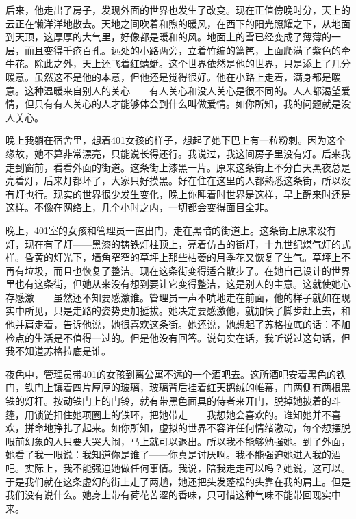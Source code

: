 后来，他走出了房子，发现外面的世界也发生了改变。现在正值傍晚时分，天上的云正在懒洋洋地散去。天地之间吹着和煦的暖风，在西下的阳光照耀之下，从地面到天顶，这厚厚的大气里，好像都是暖和的风。地面上的雪已经变成了薄薄的一层，而且变得千疮百孔。远处的小路两旁，立着竹编的篱笆，上面爬满了紫色的牵牛花。除此之外，天上还飞着红蜻蜓。这个世界依然是他的世界，只是添上了几分暖意。虽然这不是他的本意，但他还是觉得很好。他在小路上走着，满身都是暖意。这种温暖来自别人的关心——有人关心和没人关心是很不同的。人人都渴望爱情，但只有有人关心的人才能够体会到什么叫做爱情。如你所知，我的问题就是没人关心。 

晚上我躺在宿舍里，想着401女孩的样子，想起了她下巴上有一粒粉刺。因为这个缘故，她不算非常漂亮，只能说长得还行。我说过，我这间房子里没有灯。后来我走到窗前，看看外面的街道。这条街上漆黑一片。原来这条街上不分白天黑夜总是亮着灯，后来灯都坏了，大家只好摸黑。好在住在这里的人都熟悉这条街，所以没有灯也行。现实的世界很少发生变化，晚上你睡着时世界是这样，早上醒来时还是这样。不像在网络上，几个小时之内，一切都会变得面目全非。 



晚上，401室的女孩和管理员一直出门，走在黑暗的街道上。这条街上原来没有灯，现在有了灯——黑漆的铸铁灯柱顶上，亮着仿古的街灯，十九世纪煤气灯的式样。昏黄的灯光下，墙角窄窄的草坪上那些枯萎的月季花又恢复了生气。草坪上不再有垃圾，而且也恢复了整洁。现在这条街变得适合散步了。在她自己设计的世界里也有这条街，但她从来没有想到要让它变得整洁，这是别人的主意。这就使她心存感激——虽然还不知要感激谁。管理员一声不吭地走在前面，他的样子就如在现实中所见，只是走路的姿势更加挺拔。她决定要感激他，就加快了脚步赶上去，和他并肩走着，告诉他说，她很喜欢这条街。她还说，她想起了苏格拉底的话：不加检点的生活是不值得一过的。但是他没有回答。说句实在话，我听说过这句话，但我不知道苏格拉底是谁。 

夜色中，管理员带401的女孩到离公寓不远的一个酒吧去。这所酒吧安着黑色的铁门，铁门上镶着四片厚厚的玻璃，玻璃背后挂着红天鹅绒的帷幕，门两侧有两根黑铁的灯杆。按动铁门上的门铃，就有带黑色面具的侍者来开门，脱掉她披着的斗篷，用锁链扣住她项圈上的铁环，把她带走——我想她会喜欢的。谁知她并不喜欢，拼命地挣扎了起来。如你所知，虚拟的世界不容许任何情绪激动，每个想摆脱眼前幻象的人只要大哭大闹，马上就可以退出。所以我不能够勉强她。到了外面，她看了我一眼说：我知道你是谁了——你真是讨厌啊。我不能强迫她进入我的酒吧。实际上，我不能强迫她做任何事情。我说，陪我走走可以吗？她说，这可以。于是我们就在这条虚幻的街上走了两趟，她还把头发蓬松的头靠在我的肩上。但是我们没有说什么。她身上带有荷花苦涩的香味，只可惜这种气味不能带回现实中来。 



